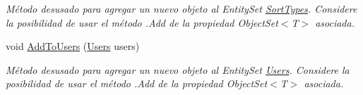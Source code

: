 \begin{DoxyCompactItemize}
\begin{DoxyCompactList}\small\item\em Método desusado para agregar un nuevo objeto al Entity\-Set \hyperlink{class_game_memory_1_1_sort_types}{Sort\-Types}. Considere la posibilidad de usar el método .Add de la propiedad Object\-Set$<$T$>$ asociada. \end{DoxyCompactList}\item 
void \hyperlink{class_game_memory_1_1_o_m_k_t_d_b_entities_ac7b3f0dd055fefc6c3a95d4fe4bf666c}{Add\-To\-Users} (\hyperlink{class_game_memory_1_1_users}{Users} users)
\begin{DoxyCompactList}\small\item\em Método desusado para agregar un nuevo objeto al Entity\-Set \hyperlink{class_game_memory_1_1_users}{Users}. Considere la posibilidad de usar el método .Add de la propiedad Object\-Set$<$T$>$ asociada. \end{DoxyCompactList}\end{DoxyCompactItemize}
